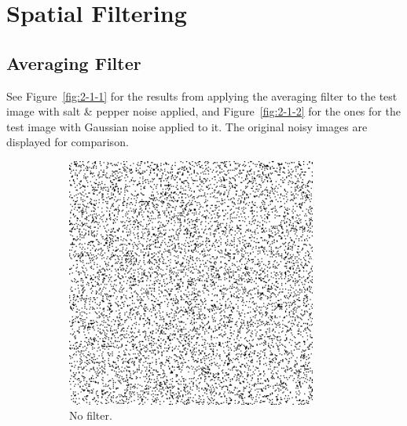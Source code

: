 \section{Spatial Filtering}
\subsection{Averaging Filter}
See Figure~\ref{fig:2-1-1} for the results from applying the averaging filter to the test image with salt \& pepper noise applied, and Figure~\ref{fig:2-1-2} for the ones for the test image with Gaussian noise applied to it.
The original noisy images are displayed for comparison.

\begin{figure}[h]
    \centering

    \begin{subfigure}[b]{0.3\textwidth}
        \includegraphics[width=0.9\textwidth]{../code/2_out/2-1_sp.png}
        \caption{No filter.}
        \label{fig:2-1-1:1}
    \end{subfigure}
    \begin{subfigure}[b]{0.3\textwidth}

\end{subfigure}
\end{figure}
